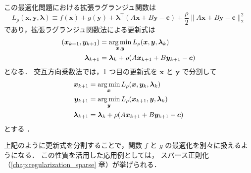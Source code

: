 この最適化問題における拡張ラグランジュ関数は
\begin{equation}
    L_{\rho}(\bm{x}, \bm{y}, \bm{\lambda}) \equiv
    f(\bm{x}) + g(\bm{y}) + \bm{\lambda}^\top (A \bm{x} + B \bm{y} - \bm{c})
    + \frac{\rho}{2} \|A \bm{x} + B \bm{y} - \bm{c}\|_2^2
\end{equation}
であり，拡張ラグランジュ関数法による更新式は
\begin{align}
    (\bm{x}_{k+1}, \bm{y}_{k+1}) & = \operatorname*{arg \thinspace min}_{\bm{x}, \bm{y}} L_{\rho}(\bm{x}, \bm{y}, \bm{\lambda}_{k}) \\
    \bm{\lambda}_{k+1}           & = \bm{\lambda}_k + \rho (A \bm{x}_{k+1} + B \bm{y}_{k+1}- \bm{c})
\end{align}
となる．
交互方向乗数法では，1 つ目の更新式を $\bm{x}$ と $\bm{y}$ で分割して
\begin{align}
    \bm{x}_{k+1}       & = \operatorname*{arg \thinspace min}_{\bm{x}} L_{\rho}(\bm{x}, \bm{y}_{k}, \bm{\lambda}_{k})   \\
    \bm{y}_{k+1}       & = \operatorname*{arg \thinspace min}_{\bm{y}} L_{\rho}(\bm{x}_{k+1}, \bm{y}, \bm{\lambda}_{k}) \\
    \bm{\lambda}_{k+1} & = \bm{\lambda}_k + \rho (A \bm{x}_{k+1} + B \bm{y}_{k+1}- \bm{c})
\end{align}
とする \cite{Boyd2010, Hisano2012}．

上記のように更新式を分割することで，関数 $f$ と $g$ の最適化を別々に扱えるようになる．
この性質を活用した応用例としては，
スパース正則化（\ref{chap:regularization_sparse} 章）が挙げられる．
